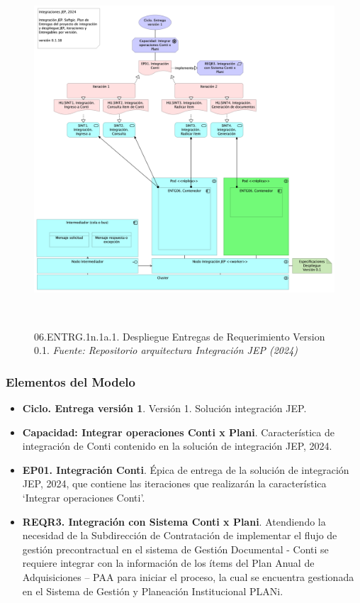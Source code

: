 \documentclass[
  paper=a4,
  ,captions=tableheading
]{scrartcl}
\begin{document}
\begin{figure}
\centering
\includegraphics[width=\textwidth,height=5.20833in]{images/06.ENTRG.1n.1a.1.DespliegueEntregasdeRequerimientoVersion0.1.png}
\caption{06.ENTRG.1n.1a.1. Despliegue Entregas de Requerimiento Version
0.1. \emph{Fuente: Repositorio arquitectura Integración JEP
(2024)}}\label{fig:id-203e737545e449e59334b47d3034d956}
\end{figure}

\subsubsection{Elementos del Modelo}\label{sec:elementos-del-modelo-2}

\begin{itemize}
\item
  \textbf{Ciclo. Entrega versión 1}. Versión 1. Solución integración
  JEP.
\item
  \textbf{Capacidad: Integrar operaciones Conti x Plani}. Característica
  de integración de Conti contenido en la solución de integración JEP,
  2024.
\item
  \textbf{EP01. Integración Conti}. Épica de entrega de la solución de
  integración JEP, 2024, que contiene las iteraciones que realizarán la
  característica `Integrar operaciones Conti'.
\item
  \textbf{REQR3. Integración con Sistema Conti x Plani}. Atendiendo la
  necesidad de la Subdirección de Contratación de implementar el flujo
  de gestión precontractual en el sistema de Gestión Documental - Conti
  se requiere integrar con la información de los ítems del Plan Anual de
  Adquisiciones -- PAA para iniciar el proceso, la cual se encuentra
  gestionada en el Sistema de Gestión y Planeación Institucional PLANi.
\end{itemize}
\end{document}
